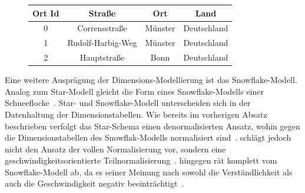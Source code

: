 \documentclass[
  language=german, %
  type=bachelor%
]{isthesis}
\begin{document}
\begin{content}
  \begin{figure}[caption={Star-Schema Beispielmodell angelehnt an~\cite{Kemper2010} Abb. 2.30}, label={fig:star-schema}]
    \resizebox{\columnwidth-90pt}{!}{}
  \end{figure}

  \begin{figure}[caption={Beispiel der Dimensionstabelle \textit{Ort} im Star-Schema}, label={table:dimension-table}]
    \begin{tabular}{c c c c}
      Ort Id & Straße & Ort & Land \\
      \toprule
      0 & Corrensstraße & Münster & Deutschland \\
      1 & Rudolf-Harbig-Weg & Münster & Deutschland \\
      2 & Hauptstraße & Bonn & Deutschland \\
    \end{tabular}
  \end{figure}

  Eine weitere Ausprägung der Dimensions-Modellierung ist das Snowflake-Modell.
  Analog zum Star-Modell gleicht die Form eines Snowflake-Modells einer
  Schneeflocke~\cite[][S. 70]{Kemper2010}. Star- und Snowflake-Modell
  unterscheiden sich in der Datenhaltung der Dimensionstabellen. Wie bereits im
  vorherigen Absatz beschrieben verfolgt das Star-Schema einen denormalisierten
  Ansatz, wohin gegen die Dimensionstabellen des Snowflak-Modells normalisiert
  sind~\cite[][S. 70]{Kemper2010}. \textsc{\citeauthor{Kemper2010}} schlägt
  jedoch nicht den Ansatz der vollen Normalisierung vor, sondern eine
  geschwindigkeitsorientierte Teilnormalisierung~\cite[][S. 70]{Kemper2010}.
  \textsc{\citeauthor{Kimball2013}} hingegen rät komplett vom Snowflake-Modell
  ab, da es seiner Meinung nach sowohl die Verständlichkeit als auch \ggf{} die
  Geschwindigkeit negativ beeinträchtigt~\cite[][S. 50]{Kimball2013}.

  \begin{figure}[caption={Teilausschnitt eines Snowflake-Schema}, label={fig:snowflake-schema}]
    \resizebox{400pt}{!}{}
  \end{figure}


\end{content}
\end{document}
